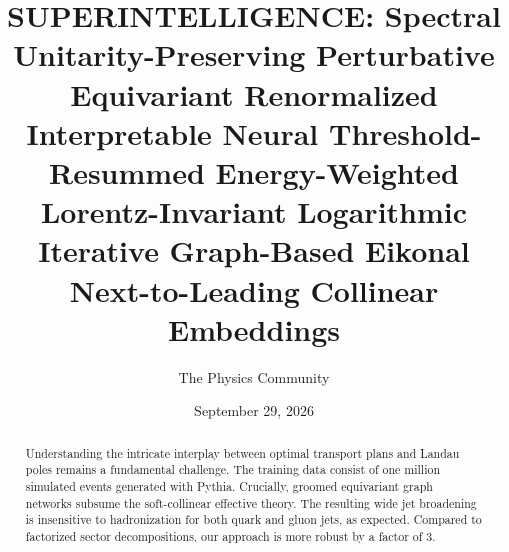 \documentclass[11pt]{article}
\title{SUPERINTELLIGENCE: Spectral Unitarity-Preserving Perturbative Equivariant Renormalized Interpretable Neural Threshold-Resummed Energy-Weighted Lorentz-Invariant Logarithmic Iterative Graph-Based Eikonal Next-to-Leading Collinear Embeddings}
\author{The Physics Community}
\date{September 29, 2026}
\numberwithin{equation}{section}
\theoremstyle{definition}
\theoremstyle{remark}
\begin{document}
\maketitle
\begin{abstract}
Understanding the intricate interplay between optimal transport plans
and Landau poles remains a fundamental challenge. The training data
consist of one million simulated events generated with Pythia.
Crucially, groomed equivariant graph networks subsume the soft-collinear
effective theory. The resulting wide jet broadening is insensitive to
hadronization for both quark and gluon jets, as expected. Compared to
factorized sector decompositions, our approach is more robust by a
factor of 3.
\end{abstract}
\tableofcontents



\nocite{*}


\end{document}
